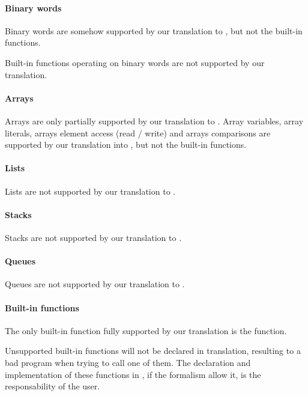\paragraph{Binary words}
Binary words are somehow supported by our translation to \jani{}, but not the built-in functions.

\begin{becareful}
	Built-in functions operating on binary words are not supported by our translation.
\end{becareful}

\paragraph{Arrays}

Arrays are only partially supported by our translation to \jani{}.
%
Array variables, array literals, arrays element access (read / write) and arrays comparisons are supported by our translation into \jani{}, but not the built-in functions.

\paragraph{Lists}

Lists are not supported by our translation to \jani{}.

\paragraph{Stacks}

Stacks are not supported by our translation to \jani{}.

\paragraph{Queues}

Queues are not supported by our translation to \jani{}.

\paragraph{Built-in functions}

The only \imitator{} built-in function fully supported by our translation is the  function.

\begin{becareful}
	Unsupported \imitator{} built-in functions will not be declared in \jani{} translation, resulting to a bad program when trying to call one of them. The declaration and implementation of these functions in \jani{}, if the \jani{} formalism allow it, is the responsability of the user.
\end{becareful}

